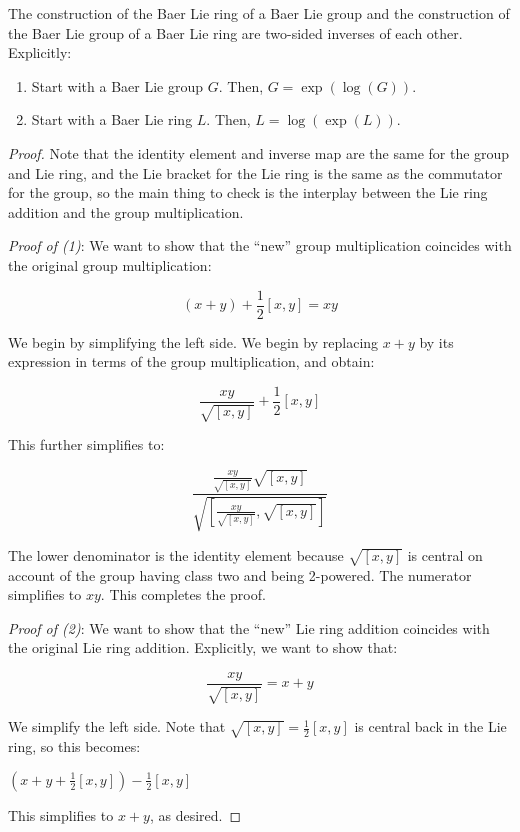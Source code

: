 \begin{lemma}\label{lemma:baer-mutual-inverses}
  The construction of the Baer Lie ring of a Baer Lie group and the
  construction of the Baer Lie group of a Baer Lie ring are two-sided
  inverses of each other. Explicitly:

  \begin{enumerate}
  \item Start with a Baer Lie group $G$. Then, $G = \exp(\log(G))$.
  \item Start with a Baer Lie ring $L$. Then, $L = \log(\exp(L))$.
  \end{enumerate}
\end{lemma}

\begin{proof}
  Note that the identity element and inverse map are the same for the
  group and Lie ring, and the Lie bracket for the Lie ring is the same
  as the commutator for the group, so the main thing to check is the
  interplay between the Lie ring addition and the group
  multiplication.

  {\em Proof of (1)}: We want to show that the ``new'' group
  multiplication coincides with the original group multiplication:

  $$(x + y) + \frac{1}{2}[x,y] = xy$$

  We begin by simplifying the left side. We begin by replacing $x + y$
  by its expression in terms of the group multiplication, and obtain:

  $$\frac{xy}{\sqrt{[x,y]}} + \frac{1}{2}[x,y]$$

  This further simplifies to:

  $$\frac{\frac{xy}{\sqrt{[x,y]}} \sqrt{[x,y]}}{\sqrt{\left[\frac{xy}{\sqrt{[x,y]}},\sqrt{[x,y]}\right]}}$$

  
  The lower denominator is the identity element because $\sqrt{[x,y]}$
  is central on account of the group having class two and being
  2-powered. The numerator simplifies to $xy$. This completes
  the proof.

  {\em Proof of (2)}: We want to show that the ``new'' Lie ring
  addition coincides with the original Lie ring addition. Explicitly,
  we want to show that:
  
  $$\frac{xy}{\sqrt{[x,y]}} = x + y$$

  We simplify the left side. Note that $\sqrt{[x,y]} =
  \frac{1}{2}[x,y]$ is central back in the Lie ring, so this becomes:
  
  $(x + y + \frac{1}{2}[x,y]) - \frac{1}{2}[x,y]$

  This simplifies to $x + y$, as desired.
\end{proof}

